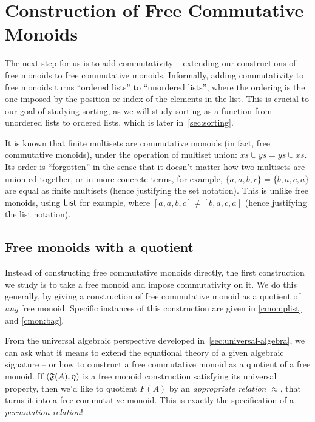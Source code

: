 
\section{Construction of Free Commutative Monoids}
\label{sec:commutative-monoids}

The next step for us is to add commutativity -- extending our constructions of free monoids to free commutative monoids.
%
Informally, adding commutativity to free monoids turns ``ordered lists'' to ``unordered lists'',
where the ordering is the one imposed by the position or index of the elements in the list.
%
This is crucial to our goal of studying sorting,
as we will study sorting as a function from unordered lists to ordered lists.
which is later in~\cref{sec:sorting}.

It is known that finite multisets are commutative monoids (in fact, free commutative monoids),
under the operation of multiset union: $xs \cup ys = ys \cup xs$.
%
Its order is ``forgotten'' in the sense that it doesn't matter how two multisets are union-ed together,
or in more concrete terms, for example, $\{a, a, b, c\} = \{b, a, c, a\}$ are equal as finite multisets
(hence justifying the set notation).
%
This is unlike free monoids, using $\operatorname{\mathsf{List}}$ for example,
where $[a, a, b, c] \neq [b, a, c, a]$ (hence justifying the list notation).

\subsection{Free monoids with a quotient}\label{cmon:qfreemon}

Instead of constructing free commutative monoids directly, the first construction we study is to take a free monoid and
impose commutativity on it.
%
We do this generally, by giving a construction of free commutative monoid as a quotient of \emph{any} free monoid.
%
Specific instances of this construction are given in \cref{cmon:plist} and \cref{cmon:bag}.

From the universal algebraic perspective developed in~\cref{sec:universal-algebra},
we can ask what it means to extend the equational theory of a given algebraic signature --
or how to construct a free commutative monoid as a quotient of a free monoid.
%
If $(\mathfrak{F}(A), \eta)$ is a free monoid construction satisfying its universal property,
then we'd like to quotient $F(A)$ by an \emph{appropriate relation} $\approx$,
that turns it into a free commutative monoid.
%
This is exactly the specification of a \emph{permutation relation}!

